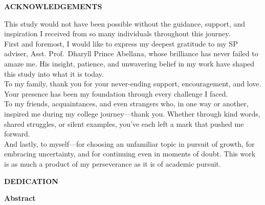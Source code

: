 \documentclass{article}
\begin{document}
\newpage

\begin{center}
\Large\textbf{ACKNOWLEDGEMENTS}
\end{center}

\vspace{1em} %

This study would not have been possible without the guidance, support, and inspiration I received from so many individuals throughout this journey. \\

First and foremost, I would like to express my deepest gratitude to my SP adviser, Asst. Prof.~Dharyll Prince Abellana, whose brilliance has never failed to amaze me. His insight, patience, and unwavering belief in my work have shaped this study into what it is today. \\

To my family, thank you for your never-ending support, encouragement, and love. Your presence has been my foundation through every challenge I faced. \\

To my friends, acquaintances, and even strangers who, in one way or another, inspired me during my college journey—thank you. Whether through kind words, shared struggles, or silent examples, you’ve each left a mark that pushed me forward. \\

And lastly, to myself—for choosing an unfamiliar topic in pursuit of growth, for embracing uncertainty, and for continuing even in moments of doubt. This work is as much a product of my perseverance as it is of academic pursuit.




\newpage

\begin{center}
\Large\textbf{DEDICATION}
\end{center}

\vspace{1em} %





\newpage

\begin{center}
\Large\textbf{Abstract}
\end{center}

\vspace{1em} %
\end{document}
